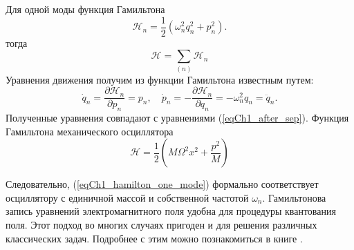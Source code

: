 Для одной моды функция Гамильтона  
\begin{equation}
\mathcal{H}_n = \frac{1}{2}\left(\omega_n^2 q_n^2 + p_n^2\right).
\label{eqCh1_hamilton_one_mode}
\end{equation}
тогда
\begin{equation}
\mathcal{H} = \sum_{(n)} \mathcal{H}_n
\label{eqCh1_hamilton_sum_mode}
\end{equation}
Уравнения движения получим из функции Гамильтона известным путем:
\begin{equation}
\dot{q}_n = \frac{\partial \mathcal{H}_n}{\partial p_n} = p_n,
\quad
\dot{p}_n = - \frac{\partial \mathcal{H}_n}{\partial q_n} =
- \omega_n^2 q_n = \ddot{q}_n.
\end{equation}
Полученные уравнения совпадают с уравнениями (\ref{eqCh1_after_sep}).  
Функция Гамильтона механического осциллятора
\[
\mathcal{H} = \frac{1}{2}\left(M \Omega^2 x^2 + \frac{p^2}{M}\right)
\]

Следовательно, (\ref{eqCh1_hamilton_one_mode}) формально соответствует
осциллятору с единичной массой и собственной частотой $\omega_n$.
Гамильтонова запись уравнений 
электромагнитного поля удобна для процедуры квантования поля. Этот
подход во многих случаях пригоден и для решения различных классических
задач. Подробнее с этим можно познакомиться в книге
\cite{bCh1Quantel_Gin}.  
